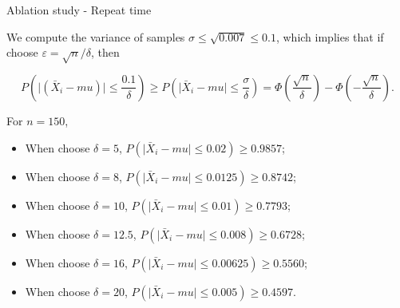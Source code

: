 \documentclass{beamer}
\begin{document}
\begin{frame}{Ablation study - Repeat time}

    We compute the variance of samples $\sigma \leq \sqrt{0.007} \leq 0.1$, which implies that if choose $\varepsilon = \sqrt{n} / \delta$, then

    $$
        P\left(\vert (\bar{X}_i - mu)\vert \leq \frac{0.1}{\delta}\right) \geq P\left(\vert \bar{X}_i - mu \vert \leq \frac{\sigma}{\delta}\right) = \varPhi\left(\frac{\sqrt{n}}{\delta}\right) - \varPhi\left(-\frac{\sqrt{n}}{\delta}\right).
    $$

    For $n = 150$,

    \begin{itemize}
        \item When choose $\delta = 5$, $P(\vert \bar{X}_i - mu \vert \leq 0.02) \geq 0.9857$;
        \item When choose $\delta = 8$, $P(\vert \bar{X}_i - mu \vert \leq 0.0125) \geq 0.8742$;
        \item When choose $\delta = 10$, $P(\vert \bar{X}_i - mu \vert \leq 0.01) \geq 0.7793$;
        \item When choose $\delta = 12.5$, $P(\vert \bar{X}_i - mu \vert \leq 0.008) \geq 0.6728$;
        \item When choose $\delta = 16$, $P(\vert \bar{X}_i - mu \vert \leq 0.00625) \geq 0.5560$;
        \item When choose $\delta = 20$, $P(\vert \bar{X}_i - mu \vert \leq 0.005) \geq 0.4597$.
    \end{itemize}

\end{frame}
\end{document}
